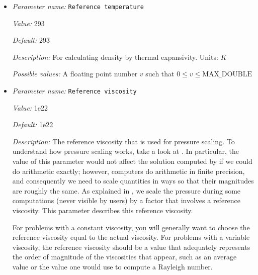 \begin{itemize}
{\it Default:} 1.1e-16


{\it Description:} List of viscosity prefactors, $A$, for background mantle and compositional fields, for a total of N+1 values, where N is the number of compositional fields. If only one value is given, then all use the same value. Units: $Pa^{-n_{\text{dislocation}}} s^{-1}$


{\it Possible values:} A list of 0 to 4294967295 elements where each element is [A floating point number $v$ such that $0 \leq v \leq \text{MAX\_DOUBLE}$]
\item {\it Parameter name:} {\tt Reference temperature}
\label{parameters:Material model/Diffusion dislocation/Reference temperature}
\label{parameters:Material_20model/Diffusion_20dislocation/Reference_20temperature}


{\it Value:} 293


{\it Default:} 293


{\it Description:} For calculating density by thermal expansivity. Units: $K$


{\it Possible values:} A floating point number $v$ such that $0 \leq v \leq \text{MAX\_DOUBLE}$
\item {\it Parameter name:} {\tt Reference viscosity}
\label{parameters:Material model/Diffusion dislocation/Reference viscosity}
\label{parameters:Material_20model/Diffusion_20dislocation/Reference_20viscosity}


{\it Value:} 1e22


{\it Default:} 1e22


{\it Description:} The reference viscosity that is used for pressure scaling. To understand how pressure scaling works, take a look at \cite{KHB12}. In particular, the value of this parameter would not affect the solution computed by \aspect{} if we could do arithmetic exactly; however, computers do arithmetic in finite precision, and consequently we need to scale quantities in ways so that their magnitudes are roughly the same. As explained in \cite{KHB12}, we scale the pressure during some computations (never visible by users) by a factor that involves a reference viscosity. This parameter describes this reference viscosity.

For problems with a constant viscosity, you will generally want to choose the reference viscosity equal to the actual viscosity. For problems with a variable viscosity, the reference viscosity should be a value that adequately represents the order of magnitude of the viscosities that appear, such as an average value or the value one would use to compute a Rayleigh number.


\end{itemize}
